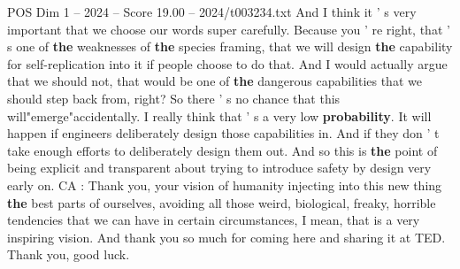 \begin{textsample}{POS Dim 1 – 2024 – Score 19.00 – 2024/t003234.txt}
And I think it ' s very important that we choose our words super carefully.
Because you ' re right, that ' s one of \textbf{the} weaknesses of \textbf{the} species framing, that we will design \textbf{the} capability for self-replication into it if people choose to do that.
And I would actually argue that we should not, that would be one of \textbf{the} dangerous capabilities that we should step back from, right?
So there ' s no chance that this will"emerge"accidentally.
I really think that ' s a very low \textbf{probability}.
It will happen if engineers deliberately design those capabilities in.
And if they don ' t take enough efforts to deliberately design them out.
And so this is \textbf{the} point of being explicit and transparent about trying to introduce safety by design very early on.
CA : Thank you, your vision of humanity injecting into this new thing \textbf{the} best parts of ourselves, avoiding all those weird, biological, freaky, horrible tendencies that we can have in certain circumstances, I mean, that is a very inspiring vision.
And thank you so much for coming here and sharing it at TED.
Thank you, good luck.

\end{textsample}

